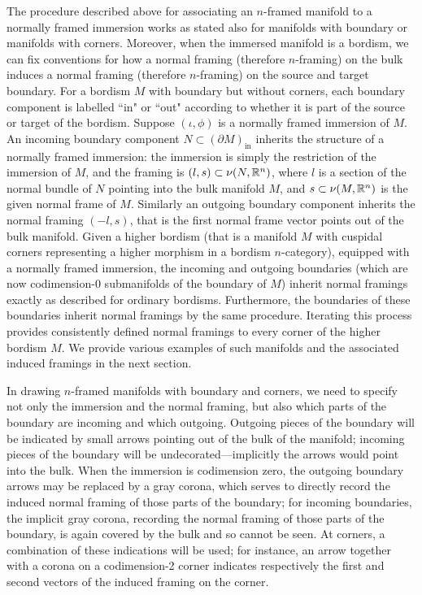 \documentclass{amsart}
\begin{document}
The procedure described above for associating an $n$-framed manifold to a normally framed immersion works as stated also for manifolds with boundary or manifolds with corners.  Moreover, when the immersed manifold is a bordism, we can fix conventions for how a normal framing (therefore $n$-framing) on the bulk induces a normal framing (therefore $n$-framing) on the source and target boundary.  For a bordism $M$ with boundary but without corners, each boundary component is labelled ``in" or ``out" according to whether it is part of the source or target of the bordism.  Suppose $(\iota, \phi)$ is a normally framed immersion of $M$.  An incoming boundary component $N \subset (\partial M)_{\textrm{in}}$ inherits the structure of a normally framed immersion: the immersion is simply the restriction of the immersion of $M$, and the framing is $(l,s) \subset \nu(N,\mathbb R^n)$, where $l$ is a section of the normal bundle of $N$ pointing into the bulk manifold $M$, and $s \subset \nu(M,\mathbb R^n)$ is the given normal frame of $M$.  Similarly an outgoing boundary component inherits the normal framing $(-l,s)$, that is the first normal frame vector points out of the bulk manifold.  Given a higher bordism (that is a manifold $M$ with cuspidal corners representing a higher morphism in a bordism $n$-category), equipped with a normally framed immersion, the incoming and outgoing boundaries (which are now codimension-0 submanifolds of the boundary of $M$) inherit normal framings exactly as described for ordinary bordisms.  Furthermore, the boundaries of these boundaries inherit normal framings by the same procedure.  Iterating this process provides consistently defined normal framings to every corner of the higher bordism $M$.  We provide various examples of such manifolds and the associated induced framings in the next section.

In drawing $n$-framed manifolds with boundary and corners, we need to specify not only the immersion and the normal framing, but also which parts of the boundary are incoming and which outgoing.  Outgoing pieces of the boundary will be indicated by small arrows pointing out of the bulk of the manifold; incoming pieces of the boundary will be undecorated---implicitly the arrows would point into the bulk.  When the immersion is codimension zero, the outgoing boundary arrows may be replaced by a gray corona, which serves to directly record the induced normal framing of those parts of the boundary; for incoming boundaries, the implicit gray corona, recording the normal framing of those parts of the boundary, is again covered by the bulk and so cannot be seen.  At corners, a combination of these indications will be used; for instance, an arrow together with a corona on a codimension-2 corner indicates respectively the first and second vectors of the induced framing on the corner.
\end{document}
